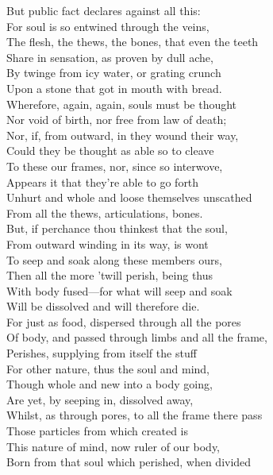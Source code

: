 But public fact declares against all this:\\
For soul is so entwined through the veins,\\
The flesh, the thews, the bones, that even the teeth\\
Share in sensation, as proven by dull ache,\\
By twinge from icy water, or grating crunch\\
Upon a stone that got in mouth with bread.\\
Wherefore, again, again, souls must be thought\\
Nor void of birth, nor free from law of death;\\
Nor, if, from outward, in they wound their way,\\
Could they be thought as able so to cleave\\
To these our frames, nor, since so interwove,\\
Appears it that they're able to go forth\\
Unhurt and whole and loose themselves unscathed\\
From all the thews, articulations, bones.\\
But, if perchance thou thinkest that the soul,\\
From outward winding in its way, is wont\\
To seep and soak along these members ours,\\
Then all the more 'twill perish, being thus\\
With body fused—for what will seep and soak\\
Will be dissolved and will therefore die.\\
For just as food, dispersed through all the pores\\
Of body, and passed through limbs and all the frame,\\
Perishes, supplying from itself the stuff\\
For other nature, thus the soul and mind,\\
Though whole and new into a body going,\\
Are yet, by seeping in, dissolved away,\\
Whilst, as through pores, to all the frame there pass\\
Those particles from which created is\\
This nature of mind, now ruler of our body,\\
Born from that soul which perished, when divided\\

